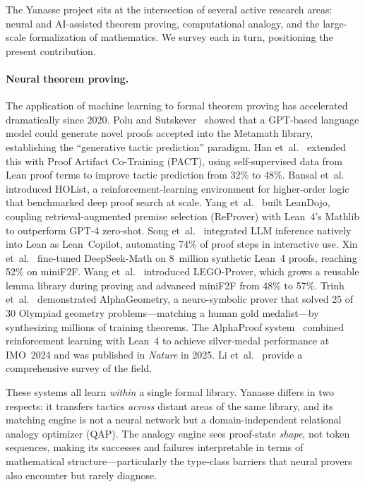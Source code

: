 \documentclass[11pt]{article}
\theoremstyle{definition}
\theoremstyle{remark}
\begin{document}
The Yanasse project sits at the intersection of several active
research areas: neural and AI-assisted theorem proving, computational
analogy, and the large-scale formalization of mathematics.  We
survey each in turn, positioning the present contribution.

\paragraph{Neural theorem proving.}
The application of machine learning to formal theorem proving has
accelerated dramatically since 2020.  Polu and
Sutskever~\cite{polu2020gptf} showed that a GPT-based language model
could generate novel proofs accepted into the Metamath library,
establishing the ``generative tactic prediction'' paradigm.  Han
et~al.~\cite{han2022pact} extended this with Proof Artifact
Co-Training (PACT), using self-supervised data from Lean proof terms
to improve tactic prediction from 32\% to 48\%.
Bansal et~al.~\cite{bansal2019holist} introduced HOList, a
reinforcement-learning environment for higher-order logic that
benchmarked deep proof search at scale.
Yang et~al.~\cite{yang2024leandojo} built LeanDojo, coupling
retrieval-augmented premise selection (ReProver) with Lean~4's
Mathlib to outperform GPT-4 zero-shot.
Song et~al.~\cite{song2024leancopilot} integrated LLM inference
natively into Lean as Lean~Copilot, automating 74\% of proof steps
in interactive use.
Xin et~al.~\cite{xin2024deepseekprover} fine-tuned DeepSeek-Math on
8~million synthetic Lean~4 proofs, reaching 52\% on miniF2F.
Wang et~al.~\cite{wang2024legoprover} introduced LEGO-Prover, which
grows a reusable lemma library during proving and advanced miniF2F
from 48\% to 57\%.
Trinh et~al.~\cite{trinh2024alphageometry} demonstrated
AlphaGeometry, a neuro-symbolic prover that solved 25 of 30 Olympiad
geometry problems---matching a human gold medalist---by synthesizing
millions of training theorems.
The AlphaProof system~\cite{alphaproof2025nature} combined
reinforcement learning with Lean~4 to achieve silver-medal
performance at IMO~2024 and was published in \emph{Nature} in 2025.
Li et~al.~\cite{li2024survey} provide a comprehensive survey of
the field.

These systems all learn \emph{within} a single formal library.
Yanasse differs in two respects: it transfers tactics
\emph{across} distant areas of the same library, and its matching
engine is not a neural network but a domain-independent
relational analogy optimizer (QAP).  The analogy engine sees
proof-state \emph{shape}, not token sequences, making its
successes and failures interpretable in terms of mathematical
structure---particularly the type-class barriers that neural
provers also encounter but rarely diagnose.
\end{document}
